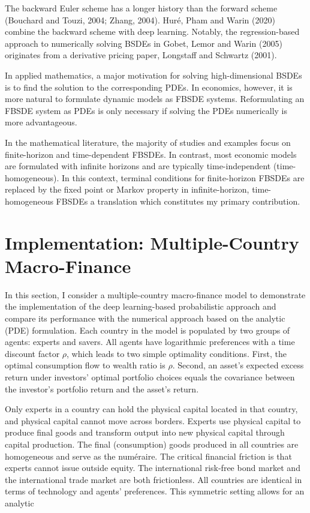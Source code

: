 \documentclass{article}
\begin{document}
The backward Euler scheme has a longer history than the forward scheme (Bouchard and Touzi, 2004; Zhang, 2004). Huré, Pham and Warin (2020) combine the backward scheme with deep learning. Notably, the regression-based approach to numerically solving BSDEs in Gobet, Lemor and Warin (2005) originates from a derivative pricing paper, Longstaff and Schwartz (2001).

In applied mathematics, a major motivation for solving high-dimensional BSDEs is to find the solution to the corresponding PDEs. In economics, however, it is more natural to formulate dynamic models as FBSDE systems. Reformulating an FBSDE system as PDEs is only necessary if solving the PDEs numerically is more advantageous.

In the mathematical literature, the majority of studies and examples focus on finite-horizon and time-dependent FBSDEs. In contrast, most economic models are formulated with infinite horizons and are typically time-independent (time-homogeneous). In this context, terminal conditions for finite-horizon FBSDEs are replaced by the fixed point or Markov property in infinite-horizon, time-homogeneous FBSDEs a translation which constitutes my primary contribution.

\section{Implementation: Multiple-Country Macro-Finance}

In this section, I consider a multiple-country macro-finance model to demonstrate the implementation of the deep learning-based probabilistic approach and compare its performance with the numerical approach based on the analytic (PDE) formulation. Each country in the model is populated by two groups of agents: experts and savers. All agents have logarithmic preferences with a time discount factor $\rho$, which leads to two simple optimality conditions. First, the optimal consumption flow to wealth ratio is $\rho$. Second, an asset's expected excess return under investors' optimal portfolio choices equals the covariance between the investor's portfolio return and the asset's return.

Only experts in a country can hold the physical capital located in that country, and physical capital cannot move across borders. Experts use physical capital to produce final goods and transform output into new physical capital through capital production. The final (consumption) goods produced in all countries are homogeneous and serve as the numéraire. The critical financial friction is that experts cannot issue outside equity. The international risk-free bond market and the international trade market are both frictionless. All countries are identical in terms of technology and agents' preferences. This symmetric setting allows for an analytic
\end{document}
